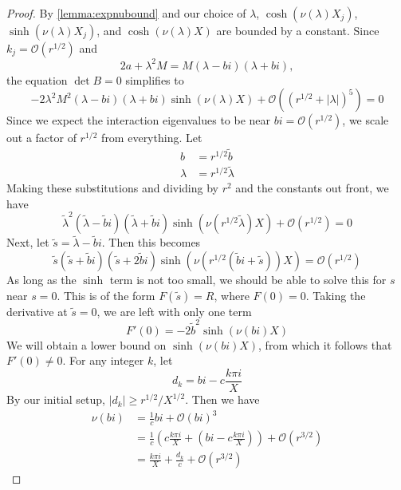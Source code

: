 \documentclass[thesis.tex]{subfiles}
\begin{document}
\begin{lemma}
\begin{proof}
By \cref{lemma:expnubound} and our choice of $\lambda$, $\cosh(\nu(\lambda)X_j)$, $\sinh(\nu(\lambda)X_j)$, and $\cosh(\nu(\lambda)X)$ are bounded by a constant. Since $k_j = \mathcal{O}(r^{1/2})$ and
\[
2a + \lambda^2 M = M( \lambda - b i) (\lambda + b i),
\]
the equation $\det B = 0$ simplifies to 
\begin{equation}\label{simpleDetB1}
-2 \lambda^2 M^2 ( \lambda - b i) (\lambda + b i)\sinh(\nu(\lambda)X) + \mathcal{O}( (r^{1/2} + |\lambda|)^5 ) = 0
\end{equation}
Since we expect the interaction eigenvalues to be near $bi = \mathcal{O}(r^{1/2})$, we scale out a factor of $r^{1/2}$ from everything. Let
\begin{align*}
b &= r^{1/2} \tilde{b} \\
\lambda &= r^{1/2} \tilde{\lambda}
\end{align*}
Making these substitutions and dividing by $r^2$ and the constants out front, we have
\begin{equation}\label{simpleDetB2}
\tilde{\lambda}^2 ( \tilde{\lambda} - \tilde{b} i) (\tilde{\lambda} + \tilde{b} i)\sinh(\nu(r^{1/2}\tilde{\lambda})X) + \mathcal{O}(r^{1/2}) = 0
\end{equation}
Next, let $\tilde{s} = \tilde{\lambda} - \tilde{b} i$. Then this becomes
\begin{equation}\label{simpleDetB3}
\tilde{s} (\tilde{s} + \tilde{b} i) (\tilde{s} + 2 \tilde{b} i)\sinh(\nu(r^{1/2}(\tilde{b}i + \tilde{s}))X) = \mathcal{O}(r^{1/2})
\end{equation}
As long as the $\sinh$ term is not too small, we should be able to solve this for $s$ near $s = 0$. This is of the form $F(\tilde{s}) = R$, where $F(0) = 0$. Taking the derivative at $\tilde{s} = 0$, we are left with only one term
\[
F'(0) = -2 \tilde{b}^2 \sinh(\nu(bi)X)
\]
We will obtain a lower bound on $\sinh(\nu(bi)X)$, from which it follows that $F'(0) \neq 0$. For any integer $k$, let
\[
d_k = bi - c\frac{k \pi i}{X}
\]
By our initial setup, $|d_k| \geq r^{1/2}/X^{1/2}$. Then we have
\begin{align*} 
\nu(bi) &= \frac{1}{c}bi + \mathcal{O}(bi)^3 \\
&= \frac{1}{c}\left( c\frac{k \pi i}{X} + \left( bi - c\frac{k \pi i}{X}\right) \right) + \mathcal{O}(r^{3/2}) \\
&= \frac{k \pi i}{X} + \frac{d_k}{c} + \mathcal{O}(r^{3/2})
\end{align*}

\end{proof}
\end{lemma}
\end{document}

